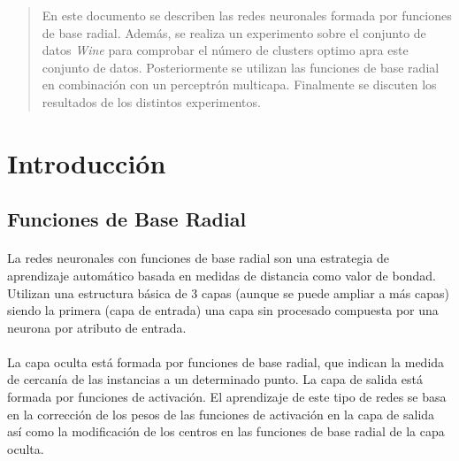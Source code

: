 \documentclass{article}
\begin{document}
	\maketitle %

	\thispagestyle{fancy} %



	\begin{abstract}
		\noindent En este documento se describen las redes neuronales formada por funciones de base radial. Además, se realiza un experimento sobre el conjunto de datos \emph{Wine} para comprobar el número de clusters optimo apra este conjunto de datos. Posteriormente se utilizan las funciones de base radial en combinación con un perceptrón multicapa. Finalmente se discuten los resultados de los distintos experimentos.
	\end{abstract}



	\section{Introducción}
	\label{sec:introducción}

		\subsection{Funciones de Base Radial}
		\label{sec:radial-basis-functions}

			\paragraph{}
			La redes neuronales con funciones de base radial son una estrategia de aprendizaje automático basada en medidas de distancia como valor de bondad. Utilizan una estructura básica de 3 capas (aunque se puede ampliar a más capas) siendo la primera (capa de entrada) una capa sin procesado compuesta por una neurona por atributo de entrada.

			\paragraph{}
			La capa oculta está formada por funciones de base radial, que indican la medida de cercanía de las instancias a un determinado punto. La capa de salida está formada por funciones de activación. El aprendizaje de este tipo de redes se basa en la corrección de los pesos de las funciones de activación en la capa de salida así como la modificación de los centros en las funciones de base radial de la capa oculta.
\end{document}
